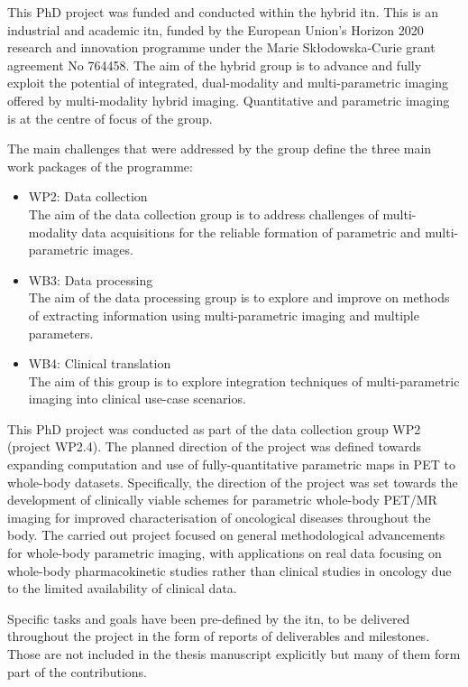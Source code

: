 This PhD project was funded and conducted within the \Gls{hybrid} \gls{itn}. This is an industrial and academic \gls{itn}, funded by the European Union's Horizon 2020 research and innovation programme under the Marie Sk\l{}odowska-Curie grant agreement No 764458.
The aim of the \gls{hybrid} group is to advance and fully exploit the potential of integrated, dual-modality and multi-parametric imaging offered by multi-modality hybrid imaging. Quantitative and parametric imaging is at the centre of focus of the group. 

The main challenges that were addressed by the group define the three main work packages of the programme:
\begin{itemize}
    \item WP2: Data collection \\
    The aim of the data collection group is to address challenges of multi-modality data acquisitions for the reliable formation of parametric and multi-parametric images. 
    \item WB3: Data processing \\
    The aim of the data processing group is to explore and improve on methods of extracting information using multi-parametric imaging and multiple parameters. 
    \item WB4: Clinical translation \\
    The aim of this group is to explore integration techniques of multi-parametric imaging into clinical use-case scenarios. 
\end{itemize}

This PhD project was conducted as part of the data collection group WP2 (project WP2.4). The planned direction of the project was defined towards expanding computation and use of fully-quantitative parametric maps in PET to whole-body datasets. Specifically, the direction of the project was set towards the development of clinically viable schemes for parametric whole-body PET/MR imaging for improved characterisation of oncological diseases throughout the body. The carried out project focused on general methodological advancements for whole-body parametric imaging, with applications on real data focusing on whole-body pharmacokinetic studies rather than clinical studies in oncology due to the limited availability of clinical data.

Specific tasks and goals have been pre-defined by the \gls{itn}, to be delivered throughout the project in the form of reports of deliverables and milestones. Those are not included in the thesis manuscript explicitly but many of them form part of the contributions. 

